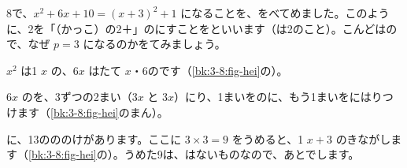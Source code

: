 
\leavevmode\label{bk:3-8:heihou}8で、$x^2+6x+10=(x+3)^2+1$ になることを、をべてめました。このように、2を「（かっこ）の2＋」のにすことを\textbf{}といいます（は2のこと）。こんどはので、なぜ $p=3$ になるのかをてみましょう。

$x^2$ は1 $x$ の、$6x$ はたて $x$・6のです（\ref{bk:3-8:fig-hei}の）。

$6x$ のを、3ずつの2まい（$3x$ と $3x$）にり、1まいをのに、もう1まいをにはりつけます（\ref{bk:3-8:fig-hei}のまん）。

に、13のののけがあります。ここに $3\times3=9$ をうめると、1 $x+3$ のきながします（\ref{bk:3-8:fig-hei}の）。うめた9は、はないものなので、あとでします。

